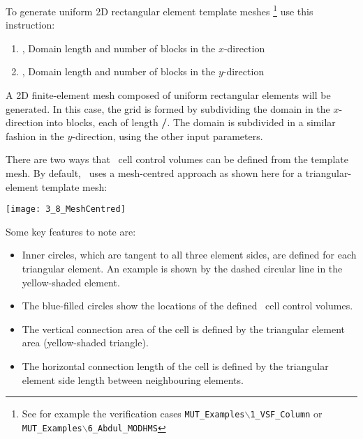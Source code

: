 To generate uniform 2D rectangular element template meshes \footnote{See for example the verification cases \texttt{MUT\_Examples$\backslash$1\_VSF\_Column} or \texttt{MUT\_Examples$\backslash$6\_Abdul\_MODHMS}} use this instruction:

    {
    \squish
    \begin{enumerate}
    \item {},   Domain length and number of blocks in the $x$-direction
    \item {},   Domain length and number of blocks in the $y$-direction
    \end{enumerate}
    A 2D finite-element mesh composed of uniform rectangular elements will be generated. In this case, the
    grid is formed by subdividing the domain in the $x$-direction into  blocks, each of length
    \textbf{/}. The domain is subdivided in a similar fashion in the $y$-direction, using the other input parameters.
    }

%
%

There are two ways that \mf\ cell control volumes can be defined from the template mesh.  By default, \mut\ uses a mesh-centred approach as shown here for a triangular-element template mesh:

    \texttt{[image: 3\_8\_MeshCentred]}

Some key features to note are:
\begin{itemize}
    \item Inner circles, which are tangent to all three element sides, are defined for each triangular element.  An example is shown by the dashed circular line in the yellow-shaded element.
    \item The blue-filled circles show the locations of the defined \mf\ cell control volumes.
    \item The vertical connection area of the cell is defined by the triangular element area (yellow-shaded triangle).
    \item The horizontal connection length of the cell is defined by the triangular element side length between neighbouring elements.
\end{itemize}

